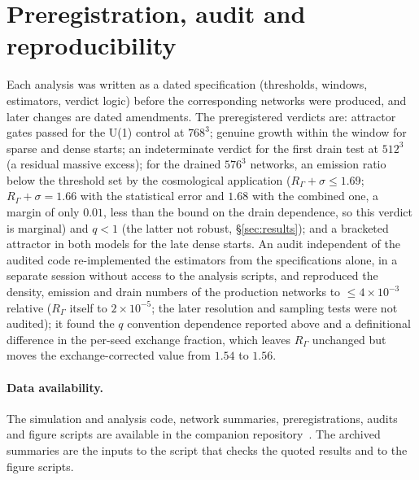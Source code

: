 \documentclass[prd,twocolumn,superscriptaddress,nofootinbib,amsmath,amssymb]{revtex4-2}
\newcommand{\RG}{R_\Gamma}
\begin{document}
\section{Preregistration, audit and reproducibility}
\label{sec:repro}

Each analysis was written as a dated specification (thresholds, windows, estimators, verdict logic) before the corresponding networks were produced, and later changes are dated amendments.
The preregistered verdicts are: attractor gates passed for the U(1) control at $768^3$; genuine growth within the window for sparse and dense starts; an indeterminate verdict for the first drain test at $512^3$ (a residual massive excess); for the drained $576^3$ networks, an emission ratio below the threshold set by the cosmological application ($\RG+\sigma\le1.69$; $\RG+\sigma=1.66$ with the statistical error and $1.68$ with the combined one, a margin of only $0.01$, less than the bound on the drain dependence, so this verdict is marginal) and $q<1$ (the latter not robust, \S\ref{sec:results}); and a bracketed attractor in both models for the late dense starts.
An audit independent of the audited code re-implemented the estimators from the specifications alone, in a separate session without access to the analysis scripts, and reproduced the density, emission and drain numbers of the production networks to $\le4\times10^{-3}$ relative ($\RG$ itself to $2\times10^{-5}$; the later resolution and sampling tests were not audited); it found the $q$ convention dependence reported above and a definitional difference in the per-seed exchange fraction, which leaves $\RG$ unchanged but moves the exchange-corrected value from $1.54$ to $1.56$.
\paragraph{Data availability.}
The simulation and analysis code, network summaries, preregistrations, audits and figure scripts are available in the companion repository~\cite{rp3_repo}. The archived summaries are the inputs to the script that checks the quoted results and to the figure scripts.
\end{document}
